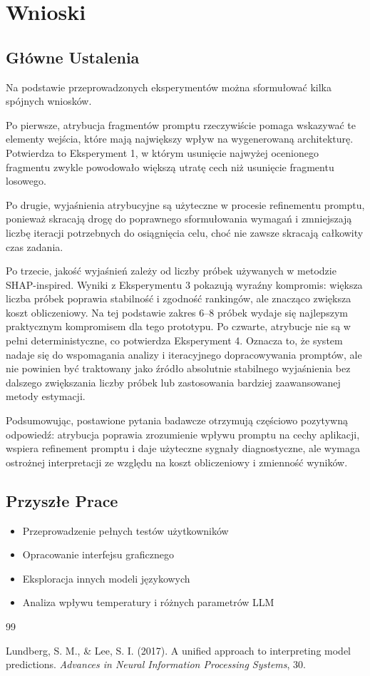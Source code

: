 \documentclass[12pt,a4paper]{article}
\begin{document}
\section{Wnioski}

\subsection{Główne Ustalenia}

Na podstawie przeprowadzonych eksperymentów można sformułować kilka spójnych wniosków.

Po pierwsze, atrybucja fragmentów promptu rzeczywiście pomaga wskazywać te elementy wejścia, które mają największy wpływ na wygenerowaną architekturę. Potwierdza to Eksperyment 1, w którym usunięcie najwyżej ocenionego fragmentu zwykle powodowało większą utratę cech niż usunięcie fragmentu losowego.

Po drugie, wyjaśnienia atrybucyjne są użyteczne w procesie refinementu promptu, ponieważ skracają drogę do poprawnego sformułowania wymagań i zmniejszają liczbę iteracji potrzebnych do osiągnięcia celu, choć nie zawsze skracają całkowity czas zadania.

Po trzecie, jakość wyjaśnień zależy od liczby próbek używanych w metodzie SHAP-inspired. Wyniki z Eksperymentu 3 pokazują wyraźny kompromis: większa liczba próbek poprawia stabilność i zgodność rankingów, ale znacząco zwiększa koszt obliczeniowy. Na tej podstawie zakres 6--8 próbek wydaje się najlepszym praktycznym kompromisem dla tego prototypu. Po czwarte, atrybucje nie są w pełni deterministyczne, co potwierdza Eksperyment 4. Oznacza to, że system nadaje się do wspomagania analizy i iteracyjnego dopracowywania promptów, ale nie powinien być traktowany jako źródło absolutnie stabilnego wyjaśnienia bez dalszego zwiększania liczby próbek lub zastosowania bardziej zaawansowanej metody estymacji.

Podsumowując, postawione pytania badawcze otrzymują częściowo pozytywną odpowiedź: atrybucja poprawia zrozumienie wpływu promptu na cechy aplikacji, wspiera refinement promptu i daje użyteczne sygnały diagnostyczne, ale wymaga ostrożnej interpretacji ze względu na koszt obliczeniowy i zmienność wyników.


\subsection{Przyszłe Prace}

\begin{itemize}
    \item Przeprowadzenie pełnych testów użytkowników
    \item Opracowanie interfejsu graficznego
    \item Eksploracja innych modeli językowych
    \item Analiza wpływu temperatury i różnych parametrów LLM
\end{itemize}


\begin{thebibliography}{99}

 Lundberg, S. M., \& Lee, S. I. (2017). A unified approach to interpreting model predictions. \textit{Advances in Neural Information Processing Systems}, 30.

\end{thebibliography}
\end{document}

